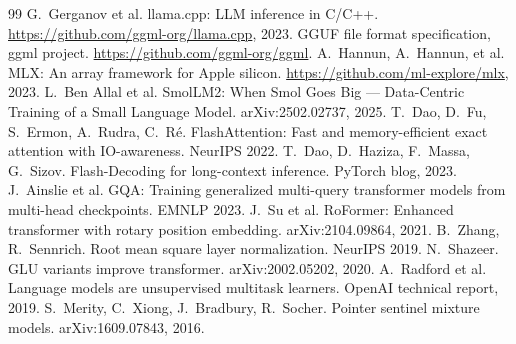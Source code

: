 \documentclass[10pt,twocolumn]{article}
\begin{document}
\begin{thebibliography}{99}\small
{} G.~Gerganov et al. llama.cpp: LLM inference in C/C++. \url{https://github.com/ggml-org/llama.cpp}, 2023.
 GGUF file format specification, ggml project. \url{https://github.com/ggml-org/ggml}.
 A.~Hannun, A.~Hannun, et al. MLX: An array framework for Apple silicon. \url{https://github.com/ml-explore/mlx}, 2023.
 L.~Ben Allal et al. SmolLM2: When Smol Goes Big --- Data-Centric Training of a Small Language Model. arXiv:2502.02737, 2025.
 T.~Dao, D.~Fu, S.~Ermon, A.~Rudra, C.~R\'e. FlashAttention: Fast and memory-efficient exact attention with IO-awareness. NeurIPS 2022.
 T.~Dao, D.~Haziza, F.~Massa, G.~Sizov. Flash-Decoding for long-context inference. PyTorch blog, 2023.
 J.~Ainslie et al. GQA: Training generalized multi-query transformer models from multi-head checkpoints. EMNLP 2023.
 J.~Su et al. RoFormer: Enhanced transformer with rotary position embedding. arXiv:2104.09864, 2021.
 B.~Zhang, R.~Sennrich. Root mean square layer normalization. NeurIPS 2019.
 N.~Shazeer. GLU variants improve transformer. arXiv:2002.05202, 2020.
 A.~Radford et al. Language models are unsupervised multitask learners. OpenAI technical report, 2019.
 S.~Merity, C.~Xiong, J.~Bradbury, R.~Socher. Pointer sentinel mixture models. arXiv:1609.07843, 2016.
\end{thebibliography}
\end{document}
